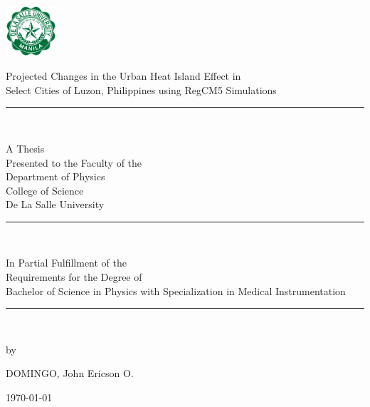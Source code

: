\begin{center}

	\includegraphics[width=0.14\textwidth]{../format/DLSU_Logo} 
	\vspace{4ex}
	
	\begin{Spacing}{1.5} 
		Projected Changes in the Urban Heat Island Effect in \\
		Select Cities of Luzon, Philippines using RegCM5 Simulations \\
	\end{Spacing}
	\vfill
	
	\rule{3cm}{0.5pt}\\
	\vfill
	
	
	A Thesis\\
	Presented to the Faculty of the \\
	Department of Physics \\
	College of Science \\
	De La Salle University \\
	\vfill
	
	\rule{3cm}{0.5pt}\\
	\vfill
	
	In Partial Fulfillment of the\\
	Requirements for the Degree of\\
	Bachelor of Science in Physics with Specialization in Medical Instrumentation\\
	\vfill
	
	\rule{3cm}{0.5pt}\\
	\vfill
	
	by \\
	\vspace{2.5ex}
	
	DOMINGO, John Ericson O.
	\vspace{2.5ex}
	
	\today \\
\end{center}

\clearpage